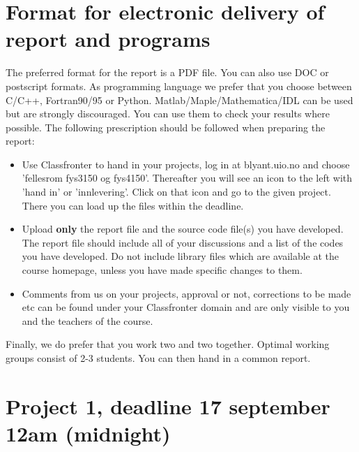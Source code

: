 \documentclass[11pt,a4wide]{article}
\begin{document}
\section*{Format for electronic delivery of report and programs}
%
The preferred format for the report is a PDF file. You can also
use DOC or postscript formats. 
As programming language we prefer that you choose between C/C++, Fortran90/95 or Python.
Matlab/Maple/Mathematica/IDL can be used 
but are strongly discouraged. You can use them to check your results where possible.
The following prescription should be followed when preparing the report:
\begin{itemize}
\item Use Classfronter to hand in your projects, log in  at 
blyant.uio.no and choose 'fellesrom fys3150 og fys4150'.
Thereafter you will see an icon to the left with 'hand in' or 'innlevering'.
Click on that icon and go to the given project. 
There you can load up the files within the deadline.
\item Upload {\bf only} the report file and the source code file(s) you have developed.
The report file should include all of your discussions and a list of the codes you have developed. 
Do not include library files which are available at the course homepage, unless you have
made specific changes to them.
\item Comments  from us on your projects, approval or not, corrections to be made 
etc can be found under
your Classfronter domain and are only visible to you and the teachers of the course.
 
\end{itemize}
Finally, 
we do prefer that you work two and two together. Optimal working groups consist of 
2-3 students. You can then hand in a common report. 

\section*{Project 1, deadline 17 september 12am (midnight)}
\end{document}
